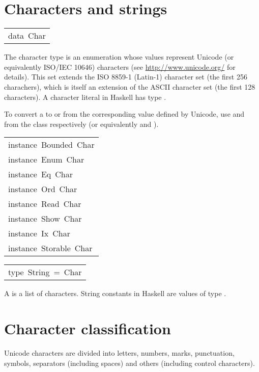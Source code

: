 \section{Characters and strings
}
\begin{haddockdesc}
\item[\begin{tabular}{@{}l}
data\ Char
\end{tabular}]\haddockbegindoc
The character type  is an enumeration whose values represent
Unicode (or equivalently ISO/IEC 10646) characters
(see \url{http://www.unicode.org/} for details).
This set extends the ISO 8859-1 (Latin-1) character set
(the first 256 charachers), which is itself an extension of the ASCII
character set (the first 128 characters).
A character literal in Haskell has type .
\par
To convert a  to or from the corresponding  value defined
by Unicode, use  and  from the
 class respectively (or equivalently  and ).
\par

\end{haddockdesc}
\begin{haddockdesc}
\item[\begin{tabular}{@{}l}
instance\ Bounded\ Char\\instance\ Enum\ Char\\instance\ Eq\ Char\\instance\ Ord\ Char\\instance\ Read\ Char\\instance\ Show\ Char\\instance\ Ix\ Char\\instance\ Storable\ Char
\end{tabular}]
\end{haddockdesc}
\begin{haddockdesc}
\item[\begin{tabular}{@{}l}
type\ String\ =\ {\char 91}Char{\char 93}
\end{tabular}]\haddockbegindoc
A  is a list of characters.  String constants in Haskell are values
 of type .
\par

\end{haddockdesc}
\section{Character classification
}
Unicode characters are divided into letters, numbers, marks,
 punctuation, symbols, separators (including spaces) and others
 (including control characters).
\par

